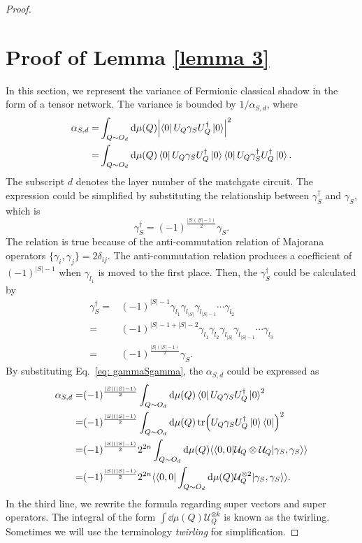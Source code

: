 \documentclass{article}
\newcommand{\supket}[1]{|#1 \rangle\rangle}
\newcommand{\supbra}[1]{\langle\langle #1 |}
\begin{document}
\begin{proof}
\section{Proof of Lemma \ref{lemma 3}}
\label{appendix 3}
 In this section, we represent the variance of Fermionic classical shadow in the form of a tensor network.
The variance is bounded by $1/\alpha_{S,d}$, where
\begin{align}
    \alpha_{S,d} =& \int_{Q\sim O_d } \dd \mu(Q) \abs{\bra{0} U_Q \gamma_S U_Q^\dagger \ket{0}}^2 \\
    =& \int_{Q\sim O_d } \dd \mu(Q) \bra{0} U_Q \gamma_S U_Q^\dagger \ket{0}\bra{0} U_Q \gamma_S^\dagger U_Q^\dagger \ket{0}.
\end{align}
The subscript $d$ denotes the layer number of the matchgate circuit. 
The expression could be simplified by substituting the relationship between $\gamma_S^\dagger$ and $\gamma_S$, which is 
\begin{equation}
    \gamma_S^\dagger = (-1)^{\frac{|S|(|S|-1)}{2}}\gamma_S.
\end{equation}
The relation is true because of the anti-commutation relation of Majorana operators $\{\gamma_i, \gamma_j\} = 2\delta_{ij}$. The anti-commutation relation produces a coefficient of $(-1)^{|S|-1}$ when $\gamma_{l_1}$ is moved to the first place. 
Then, the $\gamma_S^\dagger$ could be calculated by
\begin{align}
    \gamma_S^\dagger=& (-1)^{|S|-1}\gamma_{l_1}\gamma_{l_{|S|}}\gamma_{l_{|S|-1}}\cdots \gamma_{l_2}\\
    =& (-1)^{|S|-1 + |S|-2} \gamma_{l_1}\gamma_{l_2}\gamma_{l_{|S|}}\gamma_{l_{|S|-1}}\cdots \gamma_{l_3}\\
    \label{eq: gammaSgamma}
    =& (-1)^{\frac{|S|(|S|-1)}{2}}\gamma_S.
\end{align}
By substituting Eq.~\eqref{eq: gammaSgamma}, the $\alpha_{S, d}$ could be expressed as  
\begin{align}
    \alpha_{S,d} =& (-1)^{\frac{|S|(|S|-1)}{2}} \int_{Q \sim O_d} \dd\mu(Q) 
    \bra{0}U_Q \gamma_SU_Q^\dagger\ket{0}^2\\
    =& (-1)^{\frac{|S|(|S|-1)}{2}} \int_{Q \sim O_d} \dd\mu(Q) 
    \tr(U_Q \gamma_SU_Q^\dagger\ket{0} \bra{0} )^2\\
    =& (-1)^{\frac{|S|(|S|-1)}{2}} 2^{2n} \int_{Q \sim O_d} \dd\mu(Q) 
    \supbra{0,0} \mathcal{U}_Q\otimes\mathcal{U}_Q \supket{\gamma_S,\gamma_S} \\
    =& (-1)^{\frac{|S|(|S|-1)}{2}} 2^{2n}  \supbra{0,0}  \int_{Q \sim O_d}\dd\mu(Q) \mathcal{U}_Q^{\otimes 2} \supket{\gamma_S,\gamma_S}.
\end{align}
In the third line, we rewrite the formula regarding super vectors and super operators. The integral of the form $\int \dd \mu(Q) \mathcal{U}_Q^{\otimes k}$ is known as the twirling. Sometimes we will use the terminology \textit{twirling} for simplification.




\end{proof}
\end{document}
